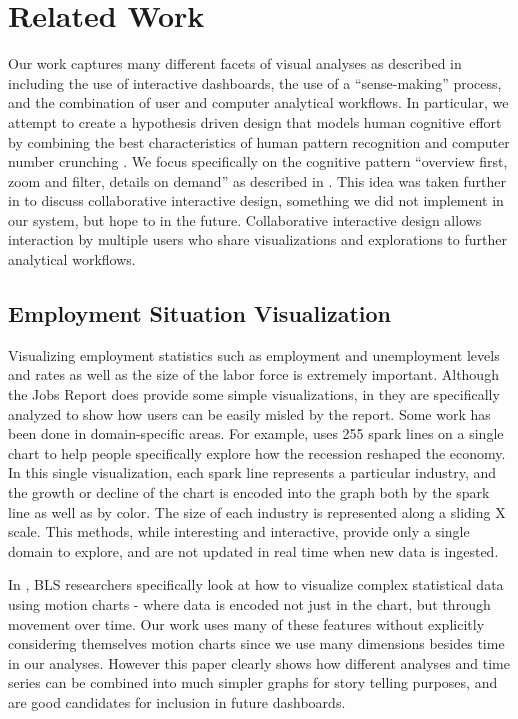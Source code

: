 \documentclass{sigchi}
\begin{document}
\section{Related Work}

Our work captures many different facets of visual analyses as described in \cite{keim_mastering_2010} including the use of interactive dashboards, the use of a ``sense-making'' process, and the combination of user and computer analytical workflows. In particular, we attempt to create a hypothesis driven design that models human cognitive effort by combining the best characteristics of human pattern recognition and computer number crunching \cite{green_visual_2008}. We focus specifically on the cognitive pattern ``overview first, zoom and filter, details on demand'' as described in \cite{heer_interactive_2012}. This idea was taken further in \cite{heer_design_2008} to discuss collaborative interactive design, something we did not implement in our system, but hope to in the future. Collaborative interactive design allows interaction by multiple users who share visualizations and explorations to further analytical workflows.

\subsection{Employment Situation Visualization}

Visualizing employment statistics such as employment and unemployment levels and rates as well as the size of the labor force is extremely important. Although the Jobs Report does provide some simple visualizations, in \cite{leonhardt_how_2014} they are specifically analyzed to show how users can be easily misled by the report. Some work has been done in domain-specific areas. For example, \cite{ashkenas_how_2014} uses 255 spark lines on a single chart to help people specifically explore how the recession reshaped the economy. In this single visualization, each spark line represents a particular industry, and the growth or decline of the chart is encoded into the graph both by the spark line as well as by color. The size of each industry is represented along a sliding X scale. This methods, while interesting and interactive, provide only a single domain to explore, and are not updated in real time when new data is ingested.

In \cite{battista_motion_2011}, BLS researchers specifically look at how to visualize complex statistical data using motion charts - where data is encoded not just in the chart, but through movement over time. Our work uses many of these features without explicitly considering themselves motion charts since we use many dimensions besides time in our analyses. However this paper clearly shows how different analyses and time series can be combined into much simpler graphs for story telling purposes, and are good candidates for inclusion in future dashboards.
\end{document}
